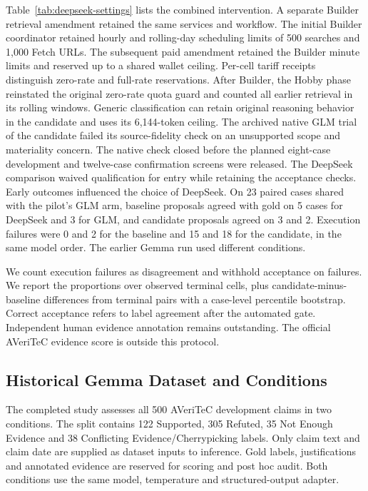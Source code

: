 \documentclass[conference]{IEEEtran}
\begin{document}
Table~\ref{tab:deepseek-settings} lists the combined intervention. A separate Builder retrieval amendment retained the same services and workflow. The initial Builder coordinator retained hourly and rolling-day scheduling limits of 500 searches and 1,000 Fetch URLs. The subsequent paid amendment retained the Builder minute limits and reserved up to a shared wallet ceiling. Per-cell tariff receipts distinguish zero-rate and full-rate reservations. After Builder, the Hobby phase reinstated the original zero-rate quota guard and counted all earlier retrieval in its rolling windows. Generic classification can retain original reasoning behavior in the candidate and uses its 6,144-token ceiling. The archived native GLM trial of the candidate failed its source-fidelity check on an unsupported scope and materiality concern. The native check closed before the planned eight-case development and twelve-case confirmation screens were released. The DeepSeek comparison waived qualification for entry while retaining the acceptance checks. Early outcomes influenced the choice of DeepSeek. On 23 paired cases shared with the pilot's GLM arm, baseline proposals agreed with gold on 5 cases for DeepSeek and 3 for GLM, and candidate proposals agreed on 3 and 2. Execution failures were 0 and 2 for the baseline and 15 and 18 for the candidate, in the same model order. The earlier Gemma run used different conditions.

We count execution failures as disagreement and withhold acceptance on failures. We report the proportions over observed terminal cells, plus candidate-minus-baseline differences from terminal pairs with a case-level percentile bootstrap. Correct acceptance refers to label agreement after the automated gate. Independent human evidence annotation remains outstanding. The official AVeriTeC evidence score is outside this protocol.

\subsection{Historical Gemma Dataset and Conditions}
The completed study assesses all 500 AVeriTeC development claims in two conditions. The split contains 122 Supported, 305 Refuted, 35 Not Enough Evidence and 38 Conflicting Evidence/Cherrypicking labels. Only claim text and claim date are supplied as dataset inputs to inference. Gold labels, justifications and annotated evidence are reserved for scoring and post hoc audit. Both conditions use the same model, temperature and structured-output adapter.
\end{document}
